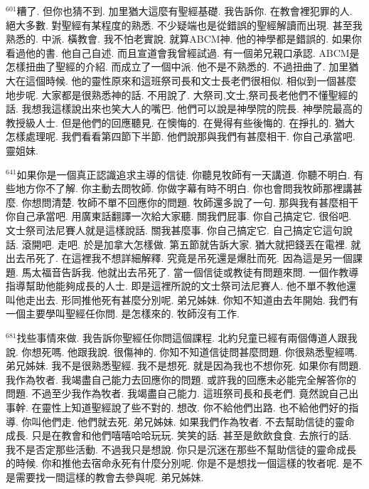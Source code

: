 \documentclass{book}
\begin{document}
$^{601}$糟了.
但你也猜不到.
加里猶大這麼有聖經基礎.
我告訴你.
在教會裡犯罪的人.
絕大多數.
對聖經有某程度的熟悉.
不少疑端也是從錯誤的聖經解讀而出現.
甚至我熟悉的.
中派.
橫教會.
我不怕老實說.
就算ABCM神.
他的神學都是錯誤的.
如果你看過他的書.
他自己自述.
而且宣道會我曾經試過.
有一個弟兄親口承認.
ABCM是怎樣扭曲了聖經的介紹.
而成立了一個中派.
他不是不熟悉的.
不過扭曲了.
加里猶大在這個時候.
他的靈性原來和這班祭司長和文士長老們很相似.
相似到一個甚麼地步呢.
大家都是很熟悉神的話.
不用說了.
大祭司,文士,祭司長老他們不懂聖經的話.
我想我這樣說出來也笑大人的嘴巴.
他們可以說是神學院的院長.
神學院最高的教授級人士.
但是他們的回應聽見.
在懊悔的.
在覺得有些後悔的.
在掙扎的.
猶大怎樣處理呢.
我們看看第四節下半節.
他們說那與我們有甚麼相干.
你自己承當吧.
靈姐妹.

$^{641}$如果你是一個真正認識追求主導的信徒.
你聽見牧師有一天講道.
你聽不明白.
有些地方你不了解.
你主動去問牧師.
你做字幕有時不明白.
你也會問我牧師那裡講甚麼.
你想問清楚.
牧師不單不回應你的問題.
牧師還多說了一句.
那與我有甚麼相干你自己承當吧.
用廣東話翻譯一次給大家聽.
關我們屁事.
你自己搞定它.
很俗吧.
文士祭司法尼賽人就是這樣說話.
關我甚麼事.
你自己搞定它.
自己搞定它這句說話.
滾開吧.
走吧.
於是加拿大怎樣做.
第五節就告訴大家.
猶大就把錢丟在電裡.
就出去吊死了.
在這裡我不想詳細解釋.
究竟是吊死還是爆肚而死.
因為這是另一個課題.
馬太福音告訴我.
他就出去吊死了.
當一個信徒或教徒有問題來問.
一個作教導指導幫助他能夠成長的人士.
即是這裡所說的文士祭司法尼賽人.
他不單不教他還叫他走出去.
形同推他死有甚麼分別呢.
弟兄姊妹.
你知不知道由去年開始.
我們有一個主要學叫聖經任你問.
是怎樣來的.
牧師沒有工作.

$^{681}$找些事情來做.
我告訴你聖經任你問這個課程.
北約兒童已經有兩個傳道人跟我說.
你想死嗎.
他跟我說.
很傷神的.
你知不知道信徒問甚麼問題.
你很熟悉聖經嗎.
弟兄姊妹.
我不是很熟悉聖經.
我不是想死.
就是因為我也不想你死.
如果你有問題.
我作為牧者.
我竭盡自己能力去回應你的問題.
或許我的回應未必能完全解答你的問題.
不過至少我作為牧者.
我竭盡自己能力.
這班祭司長和長老們.
竟然說自己出事幹.
在靈性上知道聖經說了些不對的.
想改.
你不給他們出路.
也不給他們好的指導.
你叫他們走.
他們就去死.
弟兄姊妹.
如果我們作為牧者.
不去幫助信徒的靈命成長.
只是在教會和他們嘻嘻哈哈玩玩.
笑笑的話.
甚至是飲飲食食.
去旅行的話.
我不是否定那些活動.
不過我只是想說.
你只是沉迷在那些不幫助信徒的靈命成長的時候.
你和推他去宿命永死有什麼分別呢.
你是不是想找一個這樣的牧者呢.
是不是需要找一間這樣的教會去參與呢.
弟兄姊妹.
\end{document}
